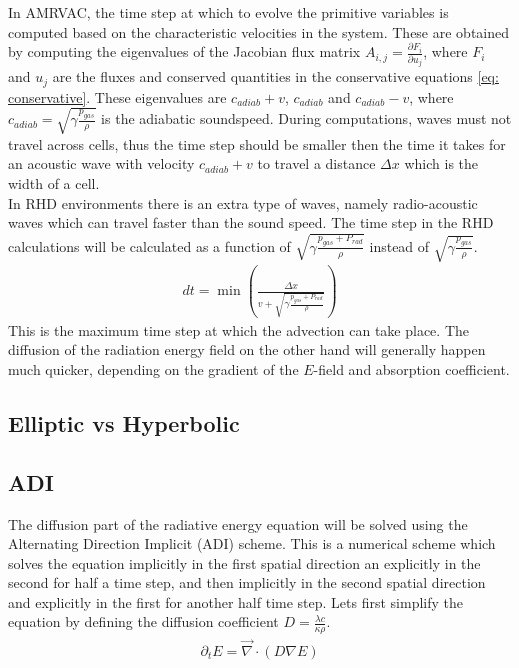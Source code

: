 In AMRVAC, the time step at which to evolve the primitive variables is computed based on the characteristic velocities in the system. These are obtained by computing the eigenvalues of the Jacobian flux matrix $A_{i,j} = \frac{\partial F_i}{\partial u_j}$, where $F_i$ and $u_j$ are the fluxes and conserved quantities in the conservative equations \eqref{eq: conservative}. These eigenvalues are $c_{adiab} + v$, $c_{adiab}$ and $c_{adiab} - v$, where $c_{adiab} = \sqrt{\gamma\frac{p_{gas}}{\rho}}$ is the adiabatic soundspeed. During computations, waves must not travel across cells, thus the time step should be smaller then the time it takes for an acoustic wave with velocity $c_{adiab} + v$ to travel a distance $\Delta x$ which is the width of a cell.\\

In RHD environments there is an extra type of waves, namely radio-acoustic waves which can travel faster than the sound speed. The time step in the RHD calculations will be calculated as a function of $\sqrt{\gamma\frac{p_{gas} + P_{rad}}{\rho}}$ instead of $\sqrt{\gamma\frac{p_{gas}}{\rho}}$.
\begin{align}
dt = \min \left(\frac{\Delta x}{v + \sqrt{\gamma\frac{p_{gas} + P_{rad}}{\rho}}} \right)
\end{align}
This is the maximum time step at which the advection can take place. The diffusion of the radiation energy field on the other hand will generally happen much quicker, depending on the gradient of the $E$-field and absorption coefficient.

\subsection{Elliptic vs Hyperbolic}
\subsection{ADI}
The diffusion part of the radiative energy equation will be solved using the Alternating Direction Implicit (ADI) scheme. This is a numerical scheme which solves the equation implicitly in the first spatial direction an explicitly in the second for half a time step, and then implicitly in the second spatial direction and explicitly in the first for another half time step. Lets first simplify the equation by defining the diffusion coefficient $D = \frac{\lambda c}{\kappa \rho}$. 
\begin{align}
\partial_t E  = \vec{\nabla} \cdot \left(D \nabla E\right) \label{eq: diffusion}
\end{align}

